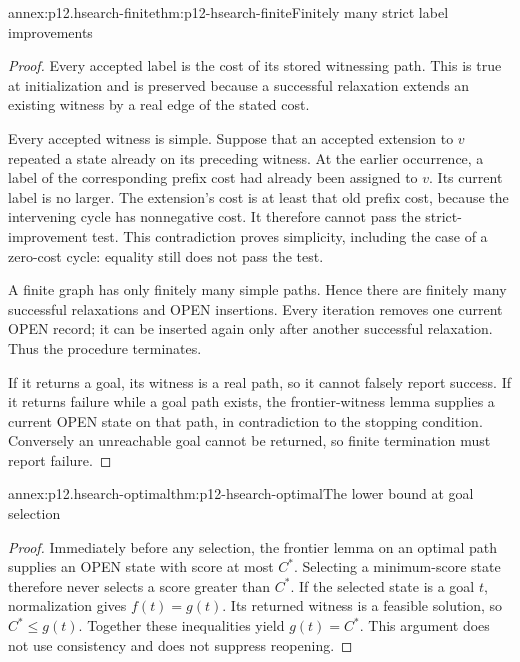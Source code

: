 \begin{annexitem}{annex:p12.hsearch-finite}{thm:p12-hsearch-finite}{Finitely many strict label improvements}
\begin{proof}
Every accepted label is the cost of its stored witnessing path. This is
true at initialization and is preserved because a successful relaxation
extends an existing witness by a real edge of the stated cost.

Every accepted witness is simple. Suppose that an accepted extension to
\(v\) repeated a state already on its preceding witness. At the earlier
occurrence, a label of the corresponding prefix cost had already been
assigned to \(v\). Its current label is no larger. The extension's
cost is at least that old prefix cost, because the intervening cycle has
nonnegative cost. It therefore cannot pass the strict-improvement test.
This contradiction proves simplicity, including the case of a zero-cost
cycle: equality still does not pass the test.

A finite graph has only finitely many simple paths. Hence there are
finitely many successful relaxations and OPEN insertions. Every iteration
removes one current OPEN record; it can be inserted again only after
another successful relaxation. Thus the procedure terminates.

If it returns a goal, its witness is a real path, so it cannot falsely
report success. If it returns failure while a goal path exists, the
frontier-witness lemma supplies a current OPEN state on that path, in
contradiction to the stopping condition. Conversely an unreachable goal
cannot be returned, so finite termination must report failure.
\end{proof}
\end{annexitem}

\begin{annexitem}{annex:p12.hsearch-optimal}{thm:p12-hsearch-optimal}{The lower bound at goal selection}
\begin{proof}
Immediately before any selection, the frontier lemma on an optimal path
supplies an OPEN state with score at most \(C^*\). Selecting a
minimum-score state therefore never selects a score greater than
\(C^*\). If the selected state is a goal \(t\), normalization gives
\(f(t)=g(t)\). Its returned witness is a feasible solution, so
\(C^*\le g(t)\). Together these inequalities yield \(g(t)=C^*\).
This argument does not use consistency and does not suppress reopening.
\end{proof}
\end{annexitem}

